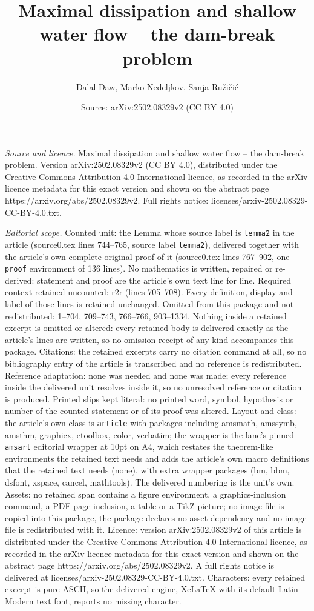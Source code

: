 \documentclass[10pt,a4paper]{amsart}
\title[Maximal dissipation and shallow water flow -- the dam-break ]{Maximal dissipation and shallow water flow -- the dam-break problem}
\author{Dalal Daw, Marko Nedeljkov, Sanja Ru\v{z}i\v{c}i\'c}
\date{Source: arXiv:2502.08329v2 (CC BY 4.0)}
\begin{document}
\maketitle

\noindent\emph{Source and licence.} Maximal dissipation and shallow water flow -- the dam-break problem. Version arXiv:2502.08329v2 (CC BY 4.0), distributed under the Creative Commons Attribution 4.0 International licence, as recorded in the arXiv licence metadata for this exact version and shown on the abstract page https://arxiv.org/abs/2502.08329v2. Full rights notice: licenses/arxiv-2502.08329-CC-BY-4.0.txt.\par\smallskip

\noindent\textit{Editorial scope.} Counted unit: the Lemma whose source label is \texttt{lemma2} in the article (source0.tex lines 744--765, source label \texttt{lemma2}), delivered together with the article's own complete original proof of it (source0.tex lines 767--902, one \texttt{proof} environment of 136 lines). No mathematics is written, repaired or re-derived: statement and proof are the article's own text line for line. Required context retained uncounted: r2r (lines 705--708). Every definition, display and label of those lines is retained unchanged. Omitted from this package and not redistributed: 1--704, 709--743, 766--766, 903--1334. Nothing inside a retained excerpt is omitted or altered: every retained body is delivered exactly as the article's lines are written, so no omission receipt of any kind accompanies this package. Citations: the retained excerpts carry no citation command at all, so no bibliography entry of the article is transcribed and no reference is redistributed. Reference adaptation: none was needed and none was made; every reference inside the delivered unit resolves inside it, so no unresolved reference or citation is produced. Printed slips kept literal: no printed word, symbol, hypothesis or number of the counted statement or of its proof was altered. Layout and class: the article's own class is \texttt{article} with packages including amsmath, amssymb, amsthm, graphicx, etoolbox, color, verbatim; the wrapper is the lane's pinned \texttt{amsart} editorial wrapper at 10pt on A4, which restates the theorem-like environments the retained text needs and adds the article's own macro definitions that the retained text needs (none), with extra wrapper packages (bm, bbm, dsfont, xspace, cancel, mathtools). The delivered numbering is the unit's own. Assets: no retained span contains a figure environment, a graphics-inclusion command, a PDF-page inclusion, a table or a TikZ picture; no image file is copied into this package, the package declares no asset dependency and no image file is redistributed with it. Licence: version arXiv:2502.08329v2 of this article is distributed under the Creative Commons Attribution 4.0 International licence, as recorded in the arXiv licence metadata for this exact version and shown on the abstract page https://arxiv.org/abs/2502.08329v2. A full rights notice is delivered at licenses/arxiv-2502.08329-CC-BY-4.0.txt. Characters: every retained excerpt is pure ASCII, so the delivered engine, XeLaTeX with its default Latin Modern text font, reports no missing character.
\end{document}

